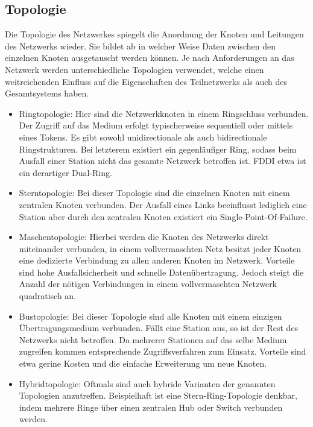     \subsection{Topologie}
    Die Topologie des Netzwerkes spiegelt die Anordnung der Knoten und Leitungen des Netzwerks wieder. Sie bildet ab in welcher Weise Daten zwischen
    den einzelnen Knoten ausgetauscht werden können. Je nach Anforderungen an das Netzwerk werden unterschiedliche Topologien verwendet,
    welche einen weitreichenden Einfluss auf die Eigenschaften des Teilnetzwerks als auch des Gesamtsystems haben.
        \begin{itemize}
            \item Ringtopologie: Hier sind die Netzwerkknoten in einem Ringschluss verbunden. Der Zugriff auf das Medium erfolgt typischerweise sequentiell 
            oder mittels eines Tokens. Es gibt sowohl unidirectionale als auch bidirectionale Ringstrukturen. Bei letzterem existiert ein gegenläufiger Ring, 
            sodass beim Ausfall einer Station nicht das gesamte Netzwerk betroffen ist. FDDI etwa ist ein derartiger Dual-Ring.
            \item Sterntopologie: Bei dieser Topologie sind die einzelnen Knoten mit einem zentralen Knoten verbunden. Der Ausfall eines Links beeinflusst lediglich
            eine Station aber durch den zentralen Knoten existiert ein Single-Point-Of-Failure. 
            \item Maschentopologie: Hierbei werden die Knoten des Netzwerks direkt miteinander verbunden, in einem vollvermaschten Netz besitzt jeder Knoten eine 
            dedizierte Verbindung zu allen anderen Knoten im Netzwerk. Vorteile sind hohe Ausfallsicherheit und schnelle Datenübertragung. Jedoch steigt die Anzahl der 
            nötigen Verbindungen in einem vollvermaschten Netzwerk quadratisch an.
            \item Bustopologie: Bei dieser Topologie sind alle Knoten mit einem einzigen Übertragungsmedium verbunden. Fällt eine Station aus, so ist der Rest des Netzwerks
            nicht betroffen. Da mehrerer Stationen auf das selbe Medium zugreifen kommen entsprechende Zugriffsverfahren zum Einsatz. Vorteile sind etwa gerine Kosten und die
            einfache Erweiterung um neue Knoten.
            \item Hybridtopologie: Oftmals sind auch hybride Varianten der genannten Topologien anzutreffen. Beispielhaft ist eine Stern-Ring-Topologie denkbar, indem
            mehrere Ringe über einen zentralen Hub oder Switch verbunden werden.
        \end{itemize}
